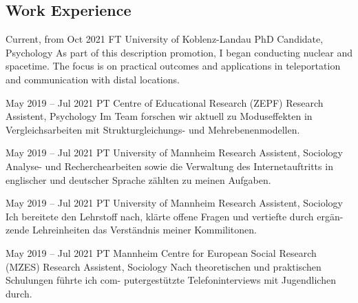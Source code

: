 \documentclass[10pt]{FreemanCV}
\begin{document}
\begin{paracol}{2}
\section{Work Experience}





\jobentry
	{Current, from Oct 2021} 
	{FT} 
	{University of Koblenz-Landau}
	{PhD Candidate, Psychology}  
	{As part of this description promotion, I began conducting nuclear and
		spacetime. The focus is on practical outcomes and applications in
		teleportation and communication with distal locations.} %


\jobentry
	{May 2019 -- Jul 2021}
	{PT} 
	{Centre of Educational Research (\textsc{ZEPF})}
	{Research Assistent, Psychology}  
	{Im Team forschen wir aktuell zu Moduseffekten in Vergleichsarbeiten mit
	Strukturgleichungs- und Mehrebenenmodellen.}


\jobentry
	{May 2019 -- Jul 2021}
	{PT} 
	{University of Mannheim}
	{Research Assistent, Sociology}  
	{Analyse- und Recherchearbeiten sowie die Verwaltung des Internetauftritts
	in englischer und deutscher Sprache zählten zu meinen Aufgaben.}


\jobentry
	{May 2019 -- Jul 2021}
	{PT} 
	{University of Mannheim}
	{Research Assistent, Sociology}  
	{Ich bereitete den Lehrstoff nach, klärte offene Fragen und vertiefte durch ergän-
	zende Lehreinheiten das Verständnis meiner Kommilitonen.}


\jobentry
	{May 2019 -- Jul 2021}
	{PT} 
	{Mannheim Centre for European Social Research (\textsc{MZES})}
	{Research Assistent, Sociology}  
	{Nach theoretischen und praktischen Schulungen führte ich com-
	putergestützte Telefoninterviews mit Jugendlichen durch.}


\end{paracol}
\end{document}
